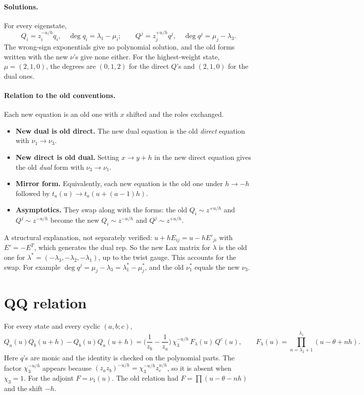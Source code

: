 \documentclass[11pt]{article}
\begin{document}
\paragraph{Solutions.} For every eigenstate,
\begin{equation}
Q_i=z_i^{-u/h}q_i,\quad \deg q_i=\lambda_1-\mu_i;\qquad Q^j=z_j^{+u/h}q^j,\quad \deg q^j=\mu_j-\lambda_3 .
\end{equation}
The wrong-sign exponentials give no polynomial solution, and the old forms written with the new $\nu$'s give none either. For the highest-weight state, $\mu=(2,1,0)$, the degrees are $(0,1,2)$ for the direct $Q$'s and $(2,1,0)$ for the dual ones.

\paragraph{Relation to the old conventions.} Each new equation is an old one with $x$ shifted and the roles exchanged.
\begin{itemize}
\item \textbf{New dual is old direct.} The new dual equation is the old \emph{direct} equation with $\nu_1\to\nu_3$.
\item \textbf{New direct is old dual.} Setting $x\to y+h$ in the new direct equation gives the old \emph{dual} form with $\nu_3\to\nu_1$.
\item \textbf{Mirror form.} Equivalently, each new equation is the old one under $h\to-h$ followed by $t_a(u)\to t_a(u+(a-1)h)$.
\item \textbf{Asymptotics.} They swap along with the forms: the old $Q_i\sim z^{+u/h}$ and $Q^j\sim z^{-u/h}$ become the new $Q_i\sim z^{-u/h}$ and $Q^j\sim z^{+u/h}$.
\end{itemize}
A structural explanation, not separately verified: $u+hE_{ij}=u-hE'_{ji}$ with $E'=-E^T$, which generates the dual rep. So the new Lax matrix for $\lambda$ is the old one for $\lambda^*=(-\lambda_3,-\lambda_2,-\lambda_1)$, up to the twist gauge. This accounts for the swap. For example $\deg q^j=\mu_j-\lambda_3=\lambda^*_1-\mu^*_j$, and the old $\nu^*_1$ equals the new $\nu_3$.

\section{QQ relation}
For every state and every cyclic $(a,b;c)$,
\begin{equation}
Q_a(u)Q_b(u+h)-Q_b(u)Q_a(u+h)=\Big(\frac1{z_b}-\frac1{z_a}\Big)\,\chi_3^{-u/h}\,F_\lambda(u)\,Q^c(u),\qquad F_\lambda(u)=\prod_{n=\lambda_2+1}^{\lambda_1}(u-\theta+nh).
\end{equation}
Here $q$'s are monic and the identity is checked on the polynomial parts. The factor $\chi_3^{-u/h}$ appears because $(z_az_b)^{-u/h}=\chi_3^{-u/h}z_c^{u/h}$, so it is absent when $\chi_3=1$. For the adjoint $F=\nu_1(u)$. The old relation had $F=\prod(u-\theta-nh)$ and the shift $-h$.
\end{document}
